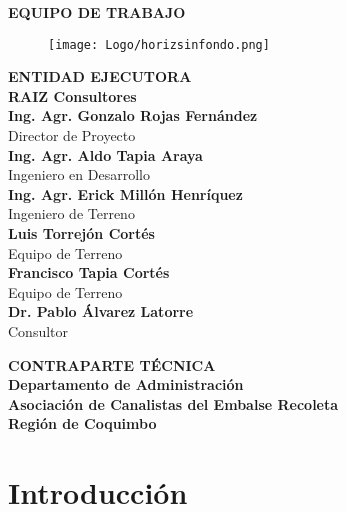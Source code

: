 \documentclass[]{article}
\begin{document}
\begin{titlepage}
\centering
\textbf{EQUIPO DE TRABAJO}\\

\begin{figure}[!h]
 \centering
   \vspace*{.5in}
      \texttt{[image: Logo/horizsinfondo.png]}
   \vspace*{.5in}
\end{figure}

\textbf{ENTIDAD EJECUTORA}\\
\bigskip 
\textbf{RAIZ Consultores}\\
\bigskip 
\textbf{Ing. Agr. Gonzalo Rojas Fernández}\\
Director de Proyecto\\
\bigskip 
\textbf{Ing. Agr. Aldo Tapia Araya}\\
Ingeniero en Desarrollo\\
\bigskip 
\textbf{Ing. Agr. Erick Millón Henríquez}\\
Ingeniero de Terreno\\
\bigskip 
\textbf{Luis Torrejón Cortés}\\
Equipo de Terreno\\
\bigskip 
\textbf{Francisco Tapia Cortés}\\
Equipo de Terreno\\
\bigskip 
\textbf{Dr. Pablo Álvarez Latorre}\\
Consultor\\

\vspace*{2in}
\begin{center}
\textbf{CONTRAPARTE TÉCNICA}\\
\textbf{Departamento de Administración}\\
\textbf{Asociación de Canalistas del Embalse Recoleta}\\
\textbf{Región de Coquimbo}\\

\end{center}

\end{titlepage}

\tableofcontents

\newpage 
\listoffigures
\newpage 
\listoftables

\newpage 
\section{Introducción}\label{introduccion}
\end{document}
